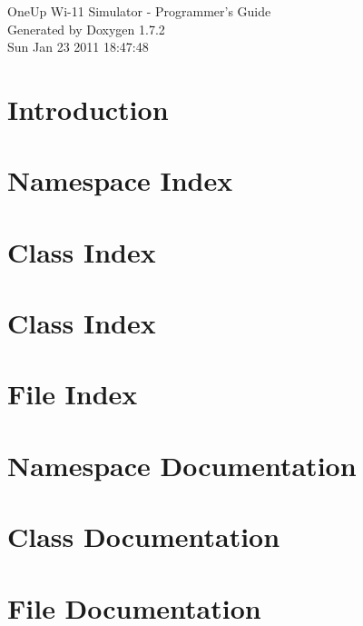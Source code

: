 \documentclass[letterpaper]{book}
\begin{document}
\hypersetup{pageanchor=false}
\begin{titlepage}
\vspace*{7cm}
\begin{center}
{\Large OneUp Wi-\/11 Simulator -\/ Programmer's Guide }\\
\vspace*{1cm}
{\large Generated by Doxygen 1.7.2}\\
\vspace*{0.5cm}
{\small Sun Jan 23 2011 18:47:48}\\
\end{center}
\end{titlepage}
\clearemptydoublepage
{}
\tableofcontents
\clearemptydoublepage
{}
\hypersetup{pageanchor=true}
\chapter{Introduction}
\label{index}\hypertarget{index}{}
\chapter{Namespace Index}

\chapter{Class Index}

\chapter{Class Index}

\chapter{File Index}

\chapter{Namespace Documentation}


\chapter{Class Documentation}


















\chapter{File Documentation}
















\printindex
\end{document}
